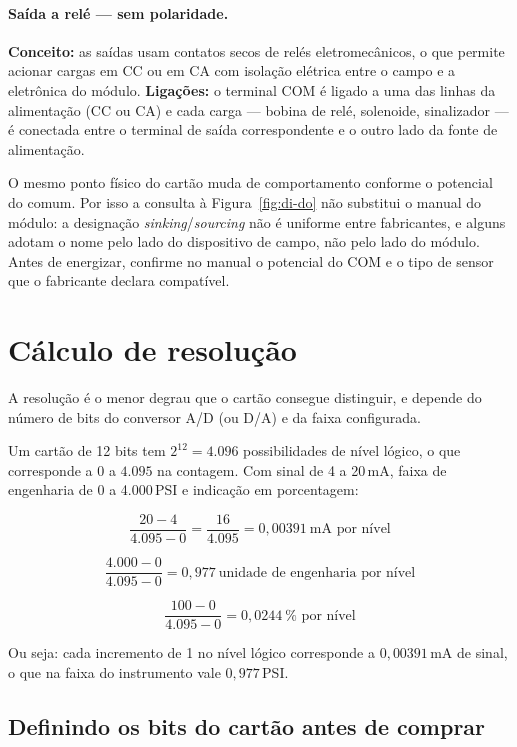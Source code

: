 \paragraph{Saída a relé --- sem polaridade.} \textbf{Conceito:} as saídas usam contatos secos de
relés eletromecânicos, o que permite acionar cargas em CC ou em CA com isolação elétrica entre o
campo e a eletrônica do módulo. \textbf{Ligações:} o terminal COM é ligado a uma das linhas da
alimentação (CC ou CA) e cada carga --- bobina de relé, solenoide, sinalizador --- é conectada entre
o terminal de saída correspondente e o outro lado da fonte de alimentação.

\begin{atencao}
O mesmo ponto físico do cartão muda de comportamento conforme o potencial do comum. Por isso a
consulta à Figura~\ref{fig:di-do} não substitui o manual do módulo: a designação
\emph{sinking}/\emph{sourcing} não é uniforme entre fabricantes, e alguns adotam o nome pelo lado do
dispositivo de campo, não pelo lado do módulo. Antes de energizar, confirme no manual o potencial do
COM e o tipo de sensor que o fabricante declara compatível.
\end{atencao}

\section{Cálculo de resolução}

A resolução é o menor degrau que o cartão consegue distinguir, e depende do número de bits do
conversor A/D (ou D/A) e da faixa configurada.

Um cartão de 12 bits tem $2^{12} = 4.096$ possibilidades de nível lógico, o que corresponde a
$0$ a $4.095$ na contagem. Com sinal de 4 a 20\,mA, faixa de engenharia de 0 a 4.000\,PSI e
indicação em porcentagem:

$$
\frac{20 - 4}{4.095 - 0} = \frac{16}{4.095} = 0{,}00391\ \text{mA por nível}
$$

$$
\frac{4.000 - 0}{4.095 - 0} = 0{,}977\ \text{unidade de engenharia por nível}
$$

$$
\frac{100 - 0}{4.095 - 0} = 0{,}0244\ \%\text{ por nível}
$$

Ou seja: cada incremento de 1 no nível lógico corresponde a $0{,}00391$\,mA de sinal, o que na faixa
do instrumento vale $0{,}977$\,PSI.

\subsection{Definindo os bits do cartão antes de comprar}


